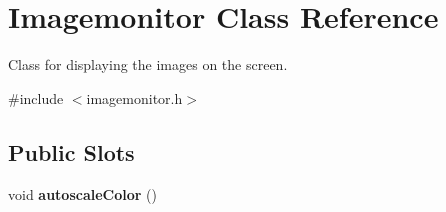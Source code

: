 \hypertarget{class_imagemonitor}{
\section{Imagemonitor Class Reference}
\label{class_imagemonitor}
}


Class for displaying the images on the screen.  




{\ttfamily \#include $<$imagemonitor.h$>$}

\subsection*{Public Slots}
\begin{DoxyCompactItemize}
\item 
\hypertarget{class_imagemonitor_a4138a1ec1a08b5a7893b4c7f05b879d7}{
void {\bfseries autoscaleColor} ()}
\label{class_imagemonitor_a4138a1ec1a08b5a7893b4c7f05b879d7}

\end{DoxyCompactItemize}
